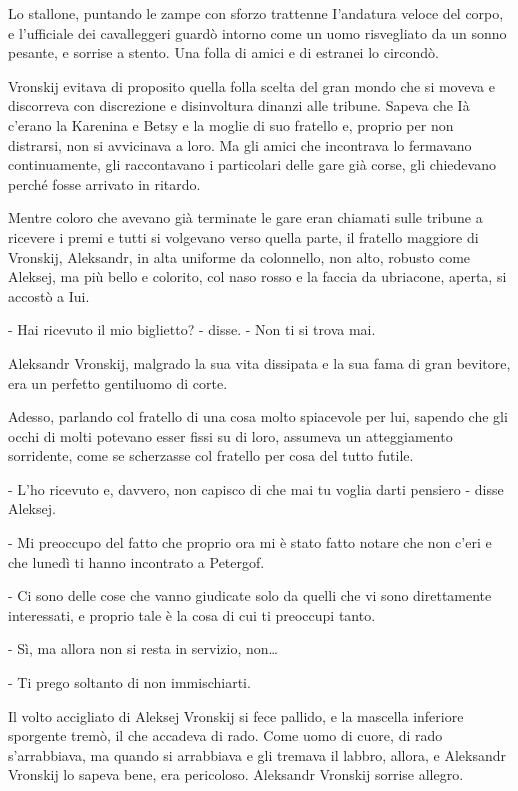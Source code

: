 Lo stallone, puntando le zampe con sforzo trattenne I'andatura veloce del corpo, e l'ufficiale dei cavalleggeri guardò intorno come un uomo risvegliato da un sonno pesante, e sorrise a stento. Una folla di amici e di estranei lo circondò. 

Vronskij evitava di proposito quella folla scelta del gran mondo che si moveva e discorreva con discrezione e disinvoltura dinanzi alle tribune. Sapeva che Ià c'erano la Karenina e Betsy e la moglie di suo fratello e, proprio per non distrarsi, non si avvicinava a loro. Ma gli amici che incontrava lo fermavano continuamente, gli raccontavano i particolari delle gare già corse, gli chiedevano perché fosse arrivato in ritardo. 

Mentre coloro che avevano già terminate le gare eran chiamati sulle tribune a ricevere i premi e tutti si volgevano verso quella parte, il fratello maggiore di Vronskij, Aleksandr, in alta uniforme da colonnello, non alto, robusto come Aleksej, ma più bello e colorito, col naso rosso e la faccia da ubriacone, aperta, si accostò a Iui. 

- Hai ricevuto il mio biglietto? - disse. - Non ti si trova mai. 

Aleksandr Vronskij, malgrado la sua vita dissipata e la sua fama di gran bevitore, era un perfetto gentiluomo di corte. 

Adesso, parlando col fratello di una cosa molto spiacevole per lui, sapendo che gli occhi di molti potevano esser fissi su di loro, assumeva un atteggiamento sorridente, come se scherzasse col fratello per cosa del tutto futile. 

- L'ho ricevuto e, davvero, non capisco di che mai tu voglia darti pensiero - disse Aleksej. 

- Mi preoccupo del fatto che proprio ora mi è stato fatto notare che non c'eri e che lunedì ti hanno incontrato a Petergof. 

- Ci sono delle cose che vanno giudicate solo da quelli che vi sono direttamente interessati, e proprio tale è la cosa di cui ti preoccupi tanto. 

- Sì, ma allora non si resta in servizio, non\ldots{} 

- Ti prego soltanto di non immischiarti. 

Il volto accigliato di Aleksej Vronskij si fece pallido, e la mascella inferiore sporgente tremò, il che accadeva di rado. Come uomo di cuore, di rado s'arrabbiava, ma quando si arrabbiava e gli tremava il labbro, allora, e Aleksandr Vronskij lo sapeva bene, era pericoloso. Aleksandr Vronskij sorrise allegro. 


